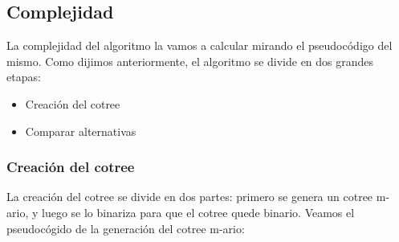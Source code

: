\subsection{Complejidad}
La complejidad del algoritmo la vamos a calcular mirando el pseudocódigo del mismo.
Como dijimos anteriormente, el algoritmo se divide en dos grandes etapas:
\begin{itemize}
	\item Creación del cotree
    \item Comparar alternativas
\end{itemize}
\subsubsection*{Creación del cotree}\;
La creación del cotree se divide en dos partes: primero se genera un cotree m-ario, y luego se lo binariza para que el cotree quede binario.
Veamos el pseudocógido de la generación del cotree m-ario: \\
\small{}
